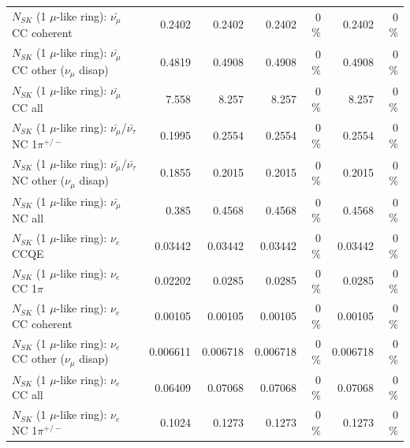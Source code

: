 \begin{table}
\begin{tabular}{| l | r | r | r  r | r  r |}
                       $N_{SK}$ (1 $\mu$-like ring): $\bar{\nu_\mu}$ CC coherent &          0.2402 &          0.2402 &          0.2402 &        0 \%  &          0.2402 &        0 \%  \\ 
        $N_{SK}$ (1 $\mu$-like ring): $\bar{\nu_\mu}$ CC other ($\nu_\mu$ disap) &          0.4819 &          0.4908 &          0.4908 &        0 \%  &          0.4908 &        0 \%  \\ 
                          $N_{SK}$ (1 $\mu$-like ring): $\bar{\nu_{\mu}}$ CC all &           7.558 &           8.257 &           8.257 &        0 \%  &           8.257 &        0 \%  \\ 
\hline
  $N_{SK}$ (1 $\mu$-like ring): $\bar{\nu_\mu}$/$\bar{\nu_\tau}$ NC 1$\pi^{+/-}$ &          0.1995 &          0.2554 &          0.2554 &        0 \%  &          0.2554 &        0 \%  \\ 
$N_{SK}$ (1 $\mu$-like ring): $\bar{\nu_\mu}$/$\bar{\nu_\tau}$ NC other ($\nu_\mu$ disap) &          0.1855 &          0.2015 &          0.2015 &        0 \%  &          0.2015 &        0 \%  \\ 
                          $N_{SK}$ (1 $\mu$-like ring): $\bar{\nu_{\mu}}$ NC all &           0.385 &          0.4568 &          0.4568 &        0 \%  &          0.4568 &        0 \%  \\ 
\hline
\hline
\hline
                                      $N_{SK}$ (1 $\mu$-like ring): $\nu_e$ CCQE &         0.03442 &         0.03442 &         0.03442 &        0 \%  &         0.03442 &        0 \%  \\ 
                                 $N_{SK}$ (1 $\mu$-like ring): $\nu_e$ CC 1$\pi$ &         0.02202 &          0.0285 &          0.0285 &        0 \%  &          0.0285 &        0 \%  \\ 
                               $N_{SK}$ (1 $\mu$-like ring): $\nu_e$ CC coherent &         0.00105 &         0.00105 &         0.00105 &        0 \%  &         0.00105 &        0 \%  \\ 
                $N_{SK}$ (1 $\mu$-like ring): $\nu_e$ CC other ($\nu_\mu$ disap) &        0.006611 &        0.006718 &        0.006718 &        0 \%  &        0.006718 &        0 \%  \\ 
                                  $N_{SK}$ (1 $\mu$-like ring): $\nu_{e}$ CC all &         0.06409 &         0.07068 &         0.07068 &        0 \%  &         0.07068 &        0 \%  \\ 
\hline
                           $N_{SK}$ (1 $\mu$-like ring): $\nu_e$ NC 1$\pi^{+/-}$ &          0.1024 &          0.1273 &          0.1273 &        0 \%  &          0.1273 &        0 \%  \\ 

\end{tabular}
\end{table}
